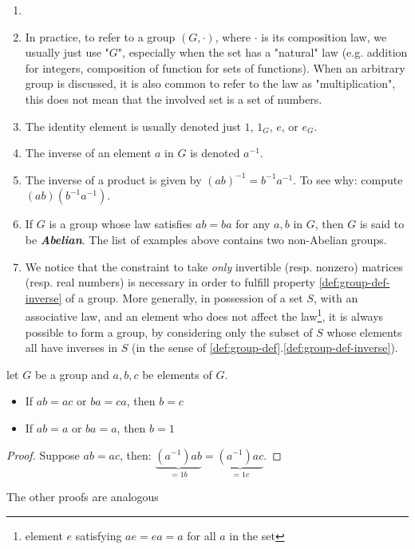 \begin{remark}

    \begin{enumerate}
        \item[]
        \item In practice, to refer to a group $(G, \cdot)$, where $\cdot$ is its composition law, we usually just use "$G$", especially when the set has a "natural" law (e.g. addition for integers, composition of function for sets of functions). When an arbitrary group is discussed, it is also common to refer to the law as "multiplication", this does not mean that the involved set is a set of numbers.
        \item The identity element is usually denoted just $1$, $1_G$, $e$, or $e_G$.
        \item The inverse of an element $a$ in $G$ is denoted $a^{-1}$. 
        \item The inverse of a product is given by $(ab)^{-1} = b^{-1}a^{-1}$. To see why: compute $(ab)(b^{-1}a^{-1})$.
        \item If $G$ is a group whose law satisfies $ab = ba$ for any $a, b$ in $G$, then $G$ is said to be \textit{\textbf{Abelian}}. The list of examples above contains two non-Abelian groups. 
        
        \item We notice that the constraint to take \textit{only} invertible (resp. nonzero) matrices (resp. real numbers) is necessary in order to fulfill property \ref{def:group-def-inverse} of a group.
More generally, in possession of a set $S$, with an associative law, and an element who does not affect the law\footnote{element $e$ satisfying $ae = ea = a$ for all $a$ in the set}, it is always possible to form a group, by considering only the subset of $S$ whose elements all have inverses in $S$ (in the sense of \ref{def:group-def}.\ref{def:group-def-inverse}).
       
    \end{enumerate}
\end{remark} 

\begin{boxedProposition} 
    let $G$ be a group and $a, b, c$ be elements of $G$.\begin{itemize}
     \item If $ab = ac$ or $ba = ca$, then $b=c$
     \item If $ab = a$ or $ba = a$, then $b=1$
    \end{itemize}
\end{boxedProposition}
\begin{proof}
    Suppose $ab = ac$, then: $\underbrace{(a^{-1})ab}_{=1b} = \underbrace{(a^{-1})ac}_{=1c}$.
\end{proof}
The other proofs are analogous

